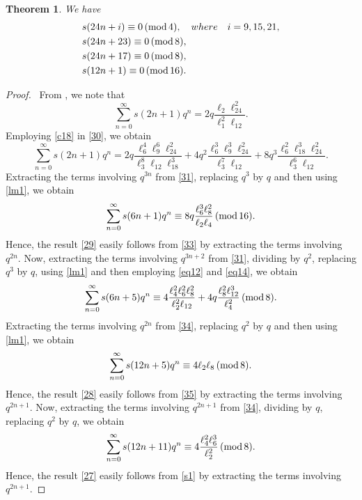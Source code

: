 \documentclass[12pt]{article}
\renewcommand{\(}{\left\(}
\renewcommand{\)}{\right\)}
\renewcommand{\[}{\left[}
\renewcommand{\]}{\right]}
\renewcommand{\pmod}[1]{\,(\textup{mod}\,#1)}
\numberwithin{equation}{section}
\theoremstyle{plain}
\newtheorem{theorem}{Theorem}[section]
\begin{document}
\begin{theorem}We have
\begin{align}
\label{26}
& s(24n+i)\equiv0\pmod{4},\quad where \quad i=9,15,21,\\
\label{27}
& s(24n+23)\equiv 0\pmod{8},\\
\label{28}
& s(24n+17)\equiv 0\pmod{8},\\
\label{29}
& s(12n+1)\equiv 0\pmod{16}.
\end{align}
\end{theorem}
\begin{proof}
~From \cite[p.12 Theorem 7]{GM1}, we note that
\begin{equation}\label{30}
\sum_{n=0}^{\infty}s(2n+1)q^n=2q\dfrac{\ell_2\ell_{24}^2}{\ell_1^2\ell_{12}}.
\end{equation}Employing \eqref{c18} in \eqref{30}, we obtain
\begin{equation}\label{31}
\sum_{n=0}^{\infty}s(2n+1)q^n=2q\dfrac{\ell_6^4\ell_9^6\ell_{24}^2}{\ell_3^8\ell_{12}\ell_{18}^3}+4q^2\dfrac{\ell_6^3\ell_9^3\ell_{24}^2}{\ell_3^7\ell_{12}}+8q^3\dfrac{\ell_6^2\ell_{18}^3\ell_{24}^2}{\ell_3^6\ell_{12}}.
\end{equation}Extracting the terms involving $q^{3n}$ from \eqref{31}, replacing $q^3$ by $q$ and then using \eqref{lm1}, we obtain
\begin{equation}\label{33}
\sum_{n=0}^{\infty}s(6n+1)q^n\equiv 8q\dfrac{\ell_6^3\ell_8^2}{\ell_2\ell_4}\pmod{16}.
\end{equation}Hence, the result \eqref{29} easily follows from \eqref{33} by extracting the terms involving $q^{2n}$. Now, extracting the terms involving $q^{3n+2}$ from \eqref{31}, dividing by $q^2$, replacing $q^3$ by $q$, using \eqref{lm1} and then employing \eqref{eq12} and \eqref{eq14}, we obtain 
\begin{equation}\label{34}
\sum_{n=0}^{\infty}s(6n+5)q^n\equiv 4\dfrac{\ell_4^2\ell_6^2\ell_8^2}{\ell_2^2\ell_{12}}+4q\dfrac{\ell_8^2\ell_{12}^3}{\ell_4^2}\pmod{8}.
\end{equation}Extracting the terms involving $q^{2n}$ from \eqref{34}, replacing $q^2$ by $q$ and then using \eqref{lm1}, we obtain
\begin{equation}\label{35}
\sum_{n=0}^{\infty}s(12n+5)q^n\equiv4\ell_2\ell_8\pmod{8}.
\end{equation}Hence, the result \eqref{28} easily follows from \eqref{35} by extracting the terms involving $q^{2n+1}$. Now, extracting the terms involving $q^{2n+1}$ from \eqref{34}, dividing by $q$, replacing $q^2$ by $q$, we obtain
\begin{equation}\label{s1}
\sum_{n=0}^{\infty}s(12n+11)q^n\equiv 4\dfrac{\ell_4^2\ell_6^3}{\ell_2^2}\pmod{8}.
\end{equation}Hence, the result \eqref{27} easily follows from \eqref{s1} by extracting the terms involving $q^{2n+1}$.


\end{proof}
\end{document}
